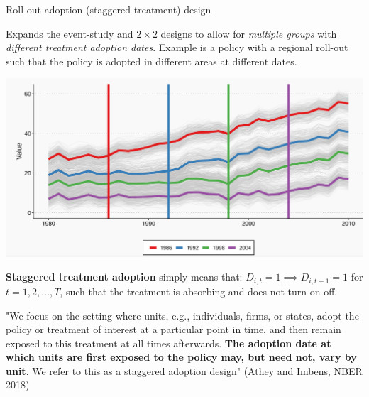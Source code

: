 \documentclass[notes,11pt, aspectratio=169]{beamer}
\newenvironment{wideitemize}{\itemize\addtolength{\itemsep}{10pt}}{\enditemize}
\begin{document}
\begin{frame}{Roll-out adoption (staggered treatment) design}
      \begin{wideitemize}
          \item Expands the event-study and $2\times2$ designs to allow for \textit{multiple groups} with \textit{different treatment adoption dates}. Example is a policy with a regional roll-out such that the policy is adopted in different areas at different dates.

    \begin{center}
        \includegraphics[width=0.6\linewidth]{StaggeredRollout.png}
    \end{center}
          
          \item \textbf{Staggered treatment adoption} simply means that: $D_{i,t}=1 \implies D_{i,t+1} = 1 $ for $t=1,2,...,T$, such that the treatment is absorbing and does not turn on-off.
      \end{wideitemize}
\end{frame}

\begin{frame}
\begin{center}
"We focus on the setting where units, e.g., individuals, firms, or states, adopt the policy or treatment of interest at a particular point in time, and then remain exposed to this treatment at all times afterwards. \textbf{The adoption date at which units are first exposed to the policy may, but need not, vary by unit}. We refer to this as a staggered adoption design" (Athey and Imbens, NBER 2018)
\end{center}
\end{frame}
\end{document}
